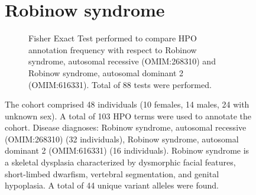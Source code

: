 \begin{figure}[htbp]
\section*{Robinow syndrome}
\centering
\begin{subfigure}[b]{0.95\textwidth}
\centering
{}
\captionsetup{justification=raggedright,singlelinecheck=false}
\caption{Fisher Exact Test performed to compare HPO annotation frequency with respect to Robinow syndrome, autosomal recessive (OMIM:268310) and Robinow syndrome, autosomal dominant 2 (OMIM:616331). Total of
        88 tests were performed. }
\end{subfigure}
\vspace{2em}
\caption{
The cohort comprised 48 individuals (10 females, 14 males, 24 with unknown sex).
A total of 103 HPO terms were used to annotate the cohort.
Disease diagnoses: Robinow syndrome, autosomal recessive (OMIM:268310) (32 individuals), Robinow syndrome, autosomal dominant 2 (OMIM:616331) (16 individuals).
Robinow syndrome is a skeletal dysplasia characterized by dysmorphic facial features, short-limbed dwarfism, vertebral segmentation, and genital hypoplasia.
A total of 44 unique variant alleles were found.
}
\end{figure}
